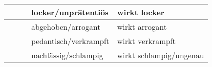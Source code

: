 \begin{longtable}{|l|l|l|l|l|l|}
     &                    &            & \multicolumn{2}{l|}{locker/unprätentiös}                    & wirkt   locker                                                                                                                                                                                                                                                                                                                                                                                                                                                                                                                                                                                                                                                                                          \\ \hline
     &                    &            & \multicolumn{2}{l|}{abgehoben/arrogant}                     & wirkt   arrogant                                                                                                                                                                                                                                                                                                                                                                                                                                                                                                                                                                                                                                                                                        \\ \hline
     &                    &            & \multicolumn{2}{l|}{pedantisch/verkrampft}                  & wirkt   verkrampft                                                                                                                                                                                                                                                                                                                                                                                                                                                                                                                                                                                                                                                                                      \\ \hline
     &                    &            & \multicolumn{2}{l|}{nachlässig/schlampig}                   & wirkt   schlampig/ungenau                                                                                                                                                                                                                                                                                                                                                                                                                                                                                                                                                                                                                                                                               \\ \hline

\end{longtable}
